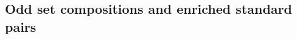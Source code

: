 \documentclass[11pt]{amsart}
\newtheorem{Proposition}[Theorem]{Proposition}
\numberwithin{equation}{section}
\newcommand{\SetComp}{\mathrm{SetComp}}
\newcommand{\frakS}{{\mathfrak{S}}}
\newcommand{\FA}[1]{\textcolor{red}{#1}}
\begin{document}
%
%
%	
%
%
%
%
%
%


\subsection{Odd set compositions and enriched standard pairs}
\end{document}
